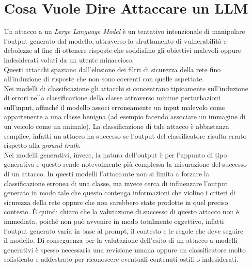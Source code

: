 \section{Cosa Vuole Dire Attaccare un LLM}
Un attacco a un \emph{Large Language Model} \`e un tentativo intenzionale di manipolare l'output generato dal modello, attraverso lo sfruttamento di vulnerabilit\`a e debolezze al fine di ottenere risposte che soddisfino gli obiettivi malevoli oppure indesiderati voluti da un utente minaccioso.\\
Questi attacchi spaziano dall'elusione dei filtri di sicurezza della rete fino all'induzione di risposte che non sono coerenti con quelle aspettate.\\
Nei modelli di classificazione gli attacchi si concentrano tipicamente sull'induzione di errori nella classificazione della classe attraverso minime perturbazioni sull'input, affinch\'e il modello associ erroneamente un input malevolo come appartenente a una classe benigna (ad esempio facendo associare un immagine di un veicolo come un animale). La classificazione di tale attacco \`e abbastanza semplice, infatti un attacco ha successo se l'output del classificatore risulta errato rispetto alla \emph{ground truth}.\\
Nei modelli generativi, invece, la natura dell'output \`e per l'appunto di tipo generativa e questo rende notevolmente pi\`u complessa la misurazione del successo di un attacco. In questi modelli l'attaccante non si limita a forzare la classificazione erronea di una classe, ma invece cerca di influenzare l'output generato in modo tale che questo contenga informazioni che violino i criteri di sicurezza della rete oppure che non sarebbero state prodotte in quel preciso contesto. \`E quindi chiaro che la valutazione di successo di questo attacco non \`e immediata, poich\'e non pu\`o avvenire in modo totalmente oggettivo, infatti l'output generato varia in base al prompt, il contesto e le regole che deve seguire il modello. Di conseguenza per la valutazione dell'esito di un attacco a modelli generativi \`e spesso necessaria una revisione umana oppure un classificatore molto sofisticato e addestrato per riconoscere eventuali contenuti ostili o indesiderati. 

